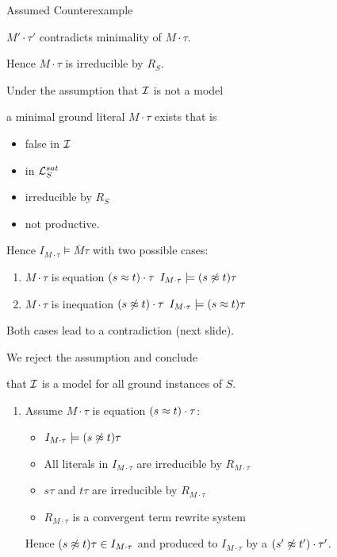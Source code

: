 \documentclass[%
handout,
]{beamer}
\begin{document}
\begin{frame}[allowframebreaks]{Assumed Counterexample}
\begin{itemize}
            $M'\cdot\tau'$ contradicts minimality of $M\cdot\tau$.

        \end{itemize}

        Hence $M\cdot\tau$ is irreducible by $R_S$.

\framebreak
        Under the assumption that $\mathcal{I}$ is not a model
        
        a minimal ground literal $M\cdot\tau$ exists that is
    \begin{itemize}
        \item false in $\mathcal{I}$
        \item in $\mathcal{L}_S^{sat}$
        \item irreducible by $R_S$
        \item not productive.
    \end{itemize}
    \vspace{1em}

    Hence $I_{M\cdot\tau}\models\overline{M}\tau$
    with two possible cases:

    \begin{enumerate}
        \item $M\cdot\tau$ is equation $(s\approx t)\cdot\tau$  \hfill $I_{M\cdot\tau}\models (s\not\approx t)\tau$
        \item $M\cdot\tau$ is inequation $(s\not\approx t)\cdot\tau$ \hfill $I_{M\cdot\tau}\models (s\approx t)\tau$
    \end{enumerate}

    \vspace{0.7em}
    Both cases lead to a contradiction (next slide). 

    We reject the assumption and conclude 
    
    that $\mathcal{I}$ is a model for all ground instances of $S$.

\framebreak


    \begin{enumerate}
        \item Assume $M\cdot\tau$ is equation $(s\approx t)\cdot\tau$:
        \begin{itemize}
            \item $I_{M\cdot\tau}\models (s\not\approx t)\tau$
            \item All literals in $I_{M\cdot\tau}$ are irreducible by $R_{M\cdot\tau}$
            \item $s\tau$ and $t\tau$ are irreducible by $R_{M\cdot\tau}$
            \item $R_{M\cdot\tau}$ is a convergent term rewrite system
        \end{itemize}
        Hence $(s\not\approx t)\tau\in I_{M\cdot\tau}$ and
        produced to $I_{M\cdot\tau}$ by a $(s'\not\approx t')\cdot\tau'$.


\end{enumerate}
\end{frame}
\end{document}
